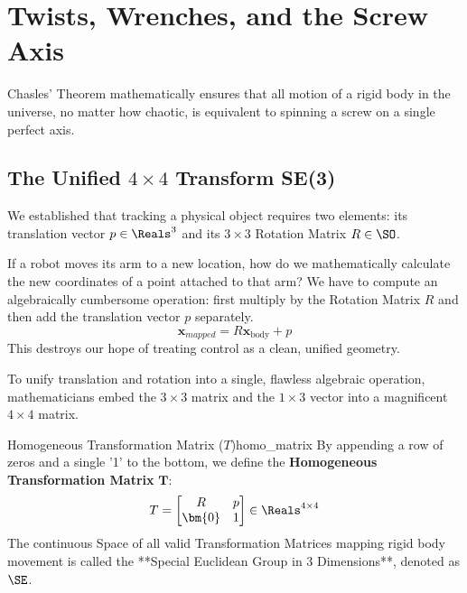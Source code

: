 \chapter{Twists, Wrenches, and the Screw Axis}
\label{ch:screw_axes}

\epigraph{%
  Chasles' Theorem mathematically ensures that all motion of a rigid body in the universe, no matter how chaotic, is equivalent to spinning a screw on a single perfect axis.
}{}

\section{The Unified $4 \times 4$ Transform SE(3)}

We established that tracking a physical object requires two elements: its translation vector $p \in \Reals^3$ and its $3 \times 3$ Rotation Matrix $R \in \SO$. 

If a robot moves its arm to a new location, how do we mathematically calculate the new coordinates of a point attached to that arm? We have to compute an algebraically cumbersome operation: first multiply by the Rotation Matrix $R$ and then add the translation vector $p$ separately. 
\begin{equation}
   \bm{x}_{mapped} = R\bm{x}_{\text{body}} + p
\end{equation}
This destroys our hope of treating control as a clean, unified geometry. 

To unify translation and rotation into a single, flawless algebraic operation, mathematicians embed the $3 \times 3$ matrix and the $1 \times 3$ vector into a magnificent $4 \times 4$ matrix.

\begin{definition}{Homogeneous Transformation Matrix ($T$)}{homo_matrix}
  By appending a row of zeros and a single '1' to the bottom, we define the \textbf{Homogeneous Transformation Matrix} $\bm{T}$:
  \begin{equation}
      T = \begin{bmatrix} R & p \\ \bm{0} & 1 \end{bmatrix} \in \Reals^{4 \times 4}
  \end{equation}
  The continuous Space of all valid Transformation Matrices mapping rigid body movement is called the **Special Euclidean Group in 3 Dimensions**, denoted as $\SE$.
\end{definition}

